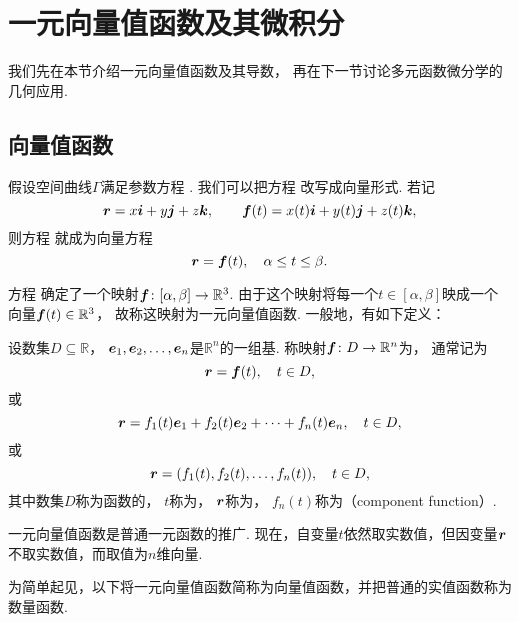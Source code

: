 \section{一元向量值函数及其微积分}
我们先在本节介绍一元向量值函数及其导数，
再在下一节讨论多元函数微分学的几何应用.

\subsection{向量值函数}
假设空间曲线\(\Gamma\)满足参数方程 .
我们可以把方程  改写成向量形式.
若记\[
	\boldsymbol{r}=x\boldsymbol{i}+y\boldsymbol{j}+z\boldsymbol{k},
	\qquad
	\boldsymbol{f}(t)=x(t)\boldsymbol{i}+y(t)\boldsymbol{j}+z(t)\boldsymbol{k},
\]
则方程 
就成为向量方程\begin{equation}\label{equation:解析几何.曲面的参数方程.向量形式}
	\boldsymbol{r}=\boldsymbol{f}(t),
	\quad \alpha \leq t \leq \beta.
\end{equation}

方程 
确定了一个映射\(\boldsymbol{f}\colon [\alpha,\beta]\to\mathbb{R}^3\).
由于这个映射将每一个\(t\in[\alpha,\beta]\)映成一个向量\(\boldsymbol{f}(t)\in\mathbb{R}^3\)，
故称这映射为一元向量值函数.
一般地，有如下定义：
\begin{definition}
设数集\(D \subseteq \mathbb{R}\)，
\(\boldsymbol{e}_1,\boldsymbol{e}_2,\dotsc,\boldsymbol{e}_n\)是\(\mathbb{R}^n\)的一组基.
称映射\(\boldsymbol{f}\colon D\to\mathbb{R}^n\)为，
通常记为\begin{equation}\label{equation:一元实变向量值函数.向量形式}
	\boldsymbol{r}=\boldsymbol{f}(t),
	\quad t \in D,
\end{equation}
或\begin{equation}
	\boldsymbol{r}=f_1(t)\boldsymbol{e}_1+f_2(t)\boldsymbol{e}_2+\dotsb+f_n(t)\boldsymbol{e}_n,
	\quad t \in D,
\end{equation}
或\begin{equation}
	\boldsymbol{r}=(f_1(t),f_2(t),\dotsc,f_n(t)),
	\quad t \in D,
\end{equation}
其中数集\(D\)称为函数的，
\(t\)称为，
\(\boldsymbol{r}\)称为，
\(f_n(t)\)称为（component function）.
\end{definition}
一元向量值函数是普通一元函数的推广.
现在，自变量\(t\)依然取实数值，但因变量\(\boldsymbol{r}\)不取实数值，而取值为\(n\)维向量.

为简单起见，以下将一元向量值函数简称为向量值函数，并把普通的实值函数称为数量函数.

